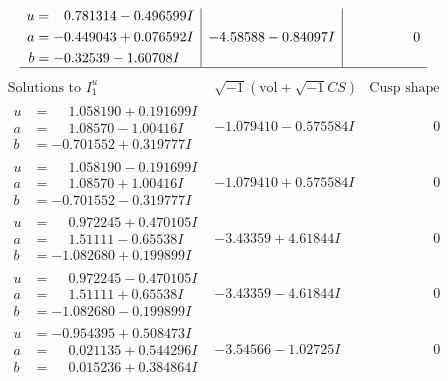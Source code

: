 \documentclass[1p]{elsarticle_modified}
\theoremstyle{definition}
\newcommand{\I}{\sqrt{-1}}
\begin{document}
$$\begin{array}{c|c|c}
\begin{aligned}
u &= \phantom{-}0.781314 - 0.496599 I \\
a &= -0.449043 + 0.076592 I \\
b &= -0.32539 - 1.60708 I\end{aligned}
 & -4.58588 - 0.84097 I & \phantom{-0.000000 } 0\\
 \hline 
 \end{array}$$\newpage$$\begin{array}{c|c|c}  
\text{Solutions to }I^u_{1}& \I (\text{vol} + \sqrt{-1}CS) & \text{Cusp shape}\\
 \hline 
\begin{aligned}
u &= \phantom{-}1.058190 + 0.191699 I \\
a &= \phantom{-}1.08570 - 1.00416 I \\
b &= -0.701552 + 0.319777 I\end{aligned}
 & -1.079410 - 0.575584 I & \phantom{-0.000000 } 0 \\ \hline\begin{aligned}
u &= \phantom{-}1.058190 - 0.191699 I \\
a &= \phantom{-}1.08570 + 1.00416 I \\
b &= -0.701552 - 0.319777 I\end{aligned}
 & -1.079410 + 0.575584 I & \phantom{-0.000000 } 0 \\ \hline\begin{aligned}
u &= \phantom{-}0.972245 + 0.470105 I \\
a &= \phantom{-}1.51111 - 0.65538 I \\
b &= -1.082680 + 0.199899 I\end{aligned}
 & -3.43359 + 4.61844 I & \phantom{-0.000000 } 0 \\ \hline\begin{aligned}
u &= \phantom{-}0.972245 - 0.470105 I \\
a &= \phantom{-}1.51111 + 0.65538 I \\
b &= -1.082680 - 0.199899 I\end{aligned}
 & -3.43359 - 4.61844 I & \phantom{-0.000000 } 0 \\ \hline\begin{aligned}
u &= -0.954395 + 0.508473 I \\
a &= \phantom{-}0.021135 + 0.544296 I \\
b &= \phantom{-}0.015236 + 0.384864 I\end{aligned}
 & -3.54566 - 1.02725 I & \phantom{-0.000000 } 0 \\ \hline\begin{aligned}

\end{aligned}
\end{array}$$
\end{document}
